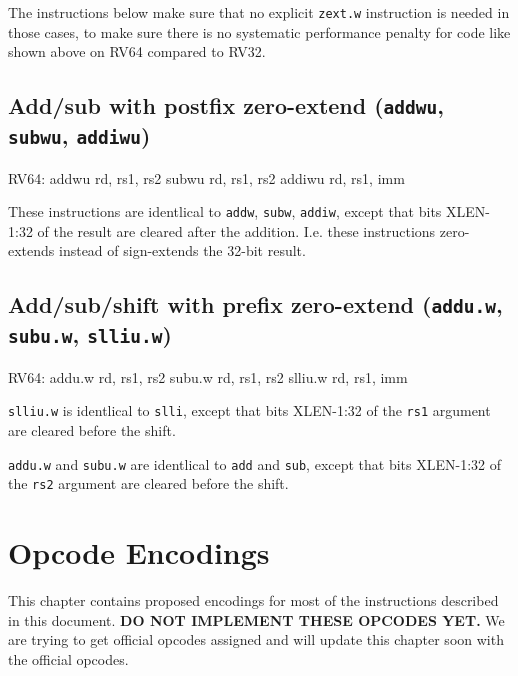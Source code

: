 The instructions below make sure that no explicit {\tt zext.w} instruction
is needed in those cases, to make sure there is no systematic performance
penalty for code like shown above on RV64 compared to RV32.

\subsection{Add/sub with postfix zero-extend ({\tt addwu}, {\tt subwu}, {\tt addiwu})}

\begin{rvb}
  RV64:
    addwu rd, rs1, rs2
    subwu rd, rs1, rs2
    addiwu rd, rs1, imm
\end{rvb}

These instructions are identlical to {\tt addw}, {\tt subw}, {\tt addiw},
except that bits XLEN-1:32 of the result are cleared after the addition. I.e.
these instructions zero-extends instead of sign-extends the 32-bit result.



\subsection{Add/sub/shift with prefix zero-extend ({\tt addu.w}, {\tt subu.w}, {\tt slliu.w})}

\begin{rvb}
  RV64:
    addu.w rd, rs1, rs2
    subu.w rd, rs1, rs2
    slliu.w rd, rs1, imm
\end{rvb}

{\tt slliu.w} is identlical to {\tt slli}, except that bits XLEN-1:32 of the
{\tt rs1} argument are cleared before the shift.

{\tt addu.w} and {\tt subu.w} are identlical to {\tt add} and {\tt sub}, except
that bits XLEN-1:32 of the {\tt rs2} argument are cleared before the shift.





\section{Opcode Encodings}
\label{opcodes}

This chapter contains proposed encodings for most of the instructions described
in this document. {\bf DO NOT IMPLEMENT THESE OPCODES YET.} We are trying to get
official opcodes assigned and will update this chapter soon with the official
opcodes.

